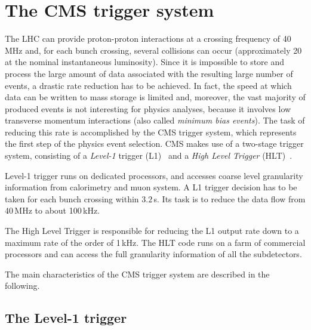 \section{The CMS trigger system}
\label{sec:Trigger}

The LHC can provide proton-proton interactions at a crossing frequency of 40\,MHz and, for each bunch crossing, several collisions can occur (approximately 20 at the nominal instantaneous luminosity). Since it is impossible to store and process the large amount of data associated with the resulting large number of events, a drastic rate reduction has to be achieved. In fact, the speed at which data can be written to mass storage is limited and, moreover, the vast majority of produced events is not interesting for physics analyses, because it involves low transverse momentum interactions (also called \emph{minimum bias events}). The task of reducing this rate is accomplished by the CMS trigger system, which represents the first step of the physics event selection. CMS makes use of a two-stage trigger system, consisting of a \emph{Level-1} trigger (L1)~\cite{Dasu:2000ge} and a \emph{High Level Trigger} (HLT)~\cite{Cittolin:578006}.

Level-1 trigger runs on dedicated processors, and accesses coarse level granularity information from calorimetry and muon system. A L1 trigger decision has to be taken for each bunch crossing within $3.2\,$\textmu s. Its task is to reduce the data flow from 40\,MHz to about 100\,kHz.

The High Level Trigger is responsible for reducing the L1 output rate down to a maximum rate of the order of 1\,kHz. The HLT code runs on a farm of commercial processors and can access the full granularity information of all the subdetectors.

The main characteristics of the CMS trigger system are described in the following.

\subsection{The Level-1 trigger}


